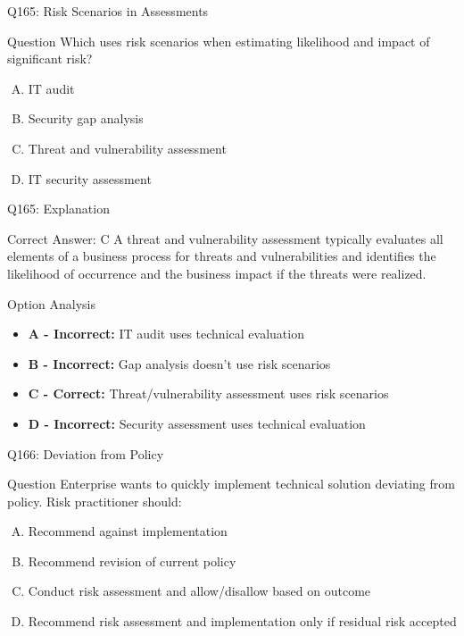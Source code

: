 \documentclass{beamer}
\begin{document}
	\begin{frame}{Q165: Risk Scenarios in Assessments}
		\begin{block}{Question}
			Which uses risk scenarios when estimating likelihood and impact of significant risk?
		\end{block}
		\begin{enumerate}[(A)]
			\item IT audit
			\item Security gap analysis
			\item Threat and vulnerability assessment
			\item IT security assessment
		\end{enumerate}
	\end{frame}
	
	\begin{frame}{Q165: Explanation}
		\begin{block}{Correct Answer: C}
			A threat and vulnerability assessment typically evaluates all elements of a business process for threats and vulnerabilities and identifies the likelihood of occurrence and the business impact if the threats were realized.
		\end{block}
		\begin{block}{Option Analysis}
			\begin{itemize}
				\item \textbf{A - Incorrect:} IT audit uses technical evaluation
				\item \textbf{B - Incorrect:} Gap analysis doesn't use risk scenarios
				\item \textbf{C - Correct:} Threat/vulnerability assessment uses risk scenarios
				\item \textbf{D - Incorrect:} Security assessment uses technical evaluation
			\end{itemize}
		\end{block}
	\end{frame}
	
	\begin{frame}{Q166: Deviation from Policy}
		\begin{block}{Question}
			Enterprise wants to quickly implement technical solution deviating from policy. Risk practitioner should:
		\end{block}
		\begin{enumerate}[(A)]
			\item Recommend against implementation
			\item Recommend revision of current policy
			\item Conduct risk assessment and allow/disallow based on outcome
			\item Recommend risk assessment and implementation only if residual risk accepted
		\end{enumerate}
	\end{frame}
	
\end{document}
